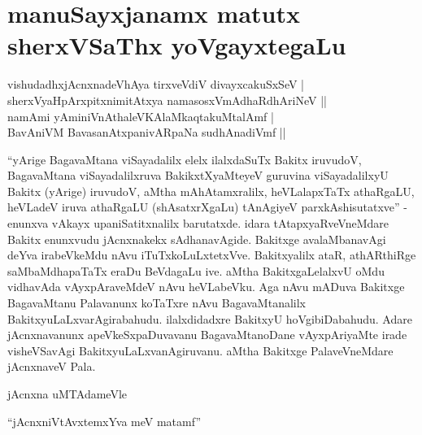 \chapter{manuSayxjanamx matutx sherxVSaThx yoVgayxtegaLu}\label{chap9}

\begin{shloka}
vishudadhxjAcnxnadeVhAya tirxveVdiV divayxcakuSxSeV |\\
sherxVyaHpArxpitxnimitAtxya namasosxVmAdhaRdhAriNeV ||\\
namAmi yAminiVnAthaleVKAlaMkaqtakuMtalAmf |\\
BavAniVM BavasanAtxpanivARpaNa sudhAnadiVmf ||
\end{shloka}

``yArige BagavaMtana viSayadalilx elelx ilalxdaSuTx Bakitx iruvudoV, BagavaMtana viSayadalilxruva BakikxtXyaMteyeV guruvina viSayadalilxyU Bakitx (yArige) iruvudoV, aMtha mAhAtamxralilx, heVLalapxTaTx athaRgaLU, heVLadeV iruva athaRgaLU (shAsatxrXgaLu) tAnAgiyeV parxkAshisutatxve'' - enunxva vAkayx upaniSatitxnalilx barutatxde. idara tAtapxyaRveVneMdare Bakitx enunxvudu jAcnxnakekx sAdhanavAgide. Bakitxge avalaMbanavAgi deYva irabeVkeMdu nAvu iTuTxkoLuLxtetxVve. Bakitxyalilx ataR, athARthiRge saMbaMdhapaTaTx eraDu BeVdagaLu ive. aMtha BakitxgaLelalxvU oMdu vidhavAda vAyxpAraveMdeV nAvu heVLabeVku. Aga nAvu mADuva Bakitxge BagavaMtanu Palavanunx koTaTxre nAvu BagavaMtanalilx BakitxyuLaLxvarAgirabahudu. ilalxdidadxre BakitxyU hoVgibiDabahudu. Adare jAcnxnavanunx apeVkeSxpaDuvavanu BagavaMtanoDane vAyxpAriyaMte irade visheVSavAgi BakitxyuLaLxvanAgiruvanu. aMtha Bakitxge PalaveVneMdare jAcnxnaveV Pala.

jAcnxna uMTAdameVle

\begin{shloka}
``jAcnxniVtAvxtemxYva meV matamf''
\end{shloka}

